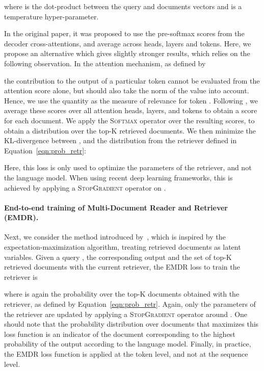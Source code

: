 \documentclass[10pt]{article} \usepackage[preprint]{tmlr}
\begin{document}
where  is the dot-product between the query and documents vectors and  is a temperature hyper-parameter.

In the original paper, it was proposed to use the pre-softmax scores from the decoder cross-attentions, and average across heads, layers and tokens.
Here, we propose an alternative which gives slightly stronger results, which relies on the following observation.
In the attention mechanism, as defined by

the contribution to the output  of a particular token  cannot be evaluated from the attention score  alone,
but should also take the norm of the value  into account.
Hence, we use the quantity  as the measure of relevance for token .
Following \citet{izacard2021distilling}, we average these scores over all attention heads, layers, and tokens to obtain a score for each document.
We apply the \textsc{Softmax} operator over the resulting scores, to obtain a distribution  over the top-K retrieved documents.
We then minimize the KL-divergence between  , and the distribution  from the retriever defined in Equation~\ref{eqn:prob_retr}:

Here, this loss is only used to optimize the parameters of the retriever, and not the language model.
When using recent deep learning frameworks, this is achieved by applying a \textsc{StopGradient} operator on .

\paragraph{End-to-end training of Multi-Document Reader and Retriever (EMDR).}
Next, we consider the method introduced by~\citet{emdr}, which is inspired by the expectation-maximization algorithm, treating retrieved documents as latent variables.
Given a query , the corresponding output  and the set  of top-K retrieved documents with the current retriever, the EMDR loss to train the retriever is

where  is again the probability over the top-K documents obtained with the retriever, as defined by Equation~\ref{eqn:prob_retr}.
Again, only the parameters of the retriever are updated
by applying a \textsc{StopGradient} operator around .
One should note that the probability distribution over documents that maximizes this loss function is an indicator of the document corresponding to the highest probability of the output according to the language model.
Finally, in practice, the EMDR loss function is applied at the token level, and not at the sequence level.
\end{document}
